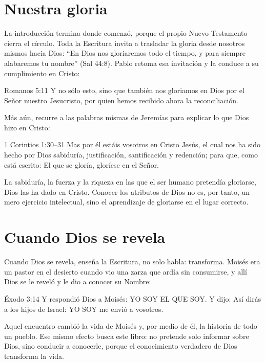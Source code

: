 \section{Nuestra gloria}

La introducción termina donde comenzó, porque el propio Nuevo Testamento cierra el círculo. Toda la Escritura invita a trasladar la gloria desde nosotros mismos hacia Dios: “En Dios nos gloriaremos todo el tiempo, y para siempre alabaremos tu nombre” (Sal 44:8). Pablo retoma esa invitación y la conduce a su cumplimiento en Cristo:

\begin{verso}{Romanos 5:11}
Y no sólo esto, sino que también nos gloriamos en Dios por el Señor nuestro Jesucristo, por quien hemos recibido ahora la reconciliación.
\end{verso}

Más aún, recurre a las palabras mismas de Jeremías para explicar lo que Dios hizo en Cristo:

\begin{verso}{1 Corintios 1:30–31}
Mas por él estáis vosotros en Cristo Jesús, el cual nos ha sido hecho por Dios sabiduría, justificación, santificación y redención; para que, como está escrito: El que se gloría, gloríese en el Señor.
\end{verso}

La sabiduría, la fuerza y la riqueza en las que el ser humano pretendía gloriarse, Dios las ha dado en Cristo. Conocer los atributos de Dios no es, por tanto, un mero ejercicio intelectual, sino el aprendizaje de gloriarse en el lugar correcto.

\section{Cuando Dios se revela}

Cuando Dios se revela, enseña la Escritura, no solo habla: transforma. Moisés era un pastor en el desierto cuando vio una zarza que ardía sin consumirse, y allí Dios se le reveló y le dio a conocer su Nombre:

\begin{verso}{Éxodo 3:14}
Y respondió Dios a Moisés: YO SOY EL QUE SOY. Y dijo: Así dirás a los hijos de Israel: YO SOY me envió a vosotros.
\end{verso}

Aquel encuentro cambió la vida de Moisés y, por medio de él, la historia de todo un pueblo. Ese mismo efecto busca este libro: no pretende solo informar sobre Dios, sino conducir a conocerle, porque el conocimiento verdadero de Dios transforma la vida.

